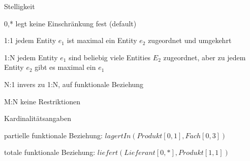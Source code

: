 \documentclass[a4paper]{article}
\begin{document}
\begin{multicols}{3}
    Stelligkeit
    \begin{description*}
        \item[0,*] legt keine Einschränkung fest (default)
        \item[1:1] jedem Entity $e_1$ ist maximal ein Entity $e_2$ zugeordnet und umgekehrt
        \item[1:N] jedem Entity $e_1$ sind beliebig viele Entities $E_2$ zugeordnet, aber zu jedem Entity $e_2$ gibt es maximal ein $e_1$
        \item[N:1] invers zu 1:N, auf funktionale Beziehung
        \item[M:N] keine Restriktionen
        \item[Kardinalitätsangaben]
        \begin{itemize*}
            \item partielle funktionale Beziehung: $lagertIn(Produkt[0,1],Fach[0,3])$
            \item totale funktionale Beziehung: $liefert(Lieferant[0,*],Produkt[1,1])$
        \end{itemize*}
    \end{description*}


\end{multicols}
\end{document}
